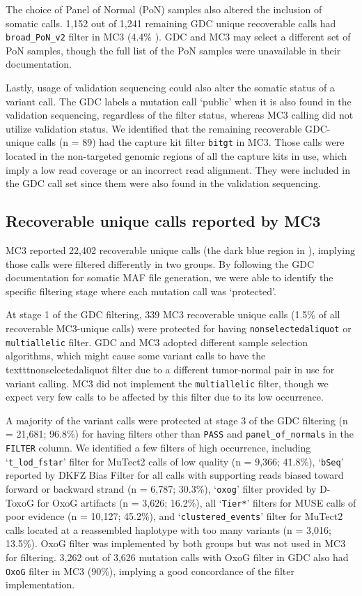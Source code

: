 The choice of Panel of Normal (PoN) samples also altered the inclusion of somatic calls. 1,152 out of 1,241 remaining GDC unique recoverable calls had \texttt{broad\_PoN\_v2} filter in MC3 (4.4\% ). GDC and MC3 may select a different set of PoN samples, though the full list of the PoN samples were unavailable in their documentation.

Lastly, usage of validation sequencing could also alter the somatic status of a variant call. The GDC labels a mutation call `public' when it is also found in the validation sequencing, regardless of the filter status, whereas MC3 calling did not utilize validation status. We identified that the remaining recoverable GDC-unique calls (n = 89) had the capture kit filter \texttt{bitgt} in MC3. Those calls were located in the non-targeted genomic regions of all the capture kits in use, which imply a low read coverage or an incorrect read alignment. They were included in the GDC call set since them were also found in the validation sequencing.


\subsection{Recoverable unique calls reported by MC3}
MC3 reported 22,402 recoverable unique calls (the dark blue region in ), implying those calls were filtered differently in two groups. By following the GDC documentation for somatic MAF file generation, we were able to identify the specific filtering stage where each mutation call was `protected'.

At stage 1 of the GDC filtering, 339 MC3 recoverable unique calls (1.5\% of all recoverable MC3-unique calls) were protected for having \texttt{nonselectedaliquot} or \texttt{multiallelic} filter. GDC and MC3 adopted different sample selection algorithms, which might cause some variant calls to have the texttt{nonselectedaliquot} filter due to a different tumor-normal pair in use for variant calling. MC3 did not implement the \texttt{multiallelic} filter, though we expect very few calls to be affected by this filter due to its low occurrence.

A majority of the variant calls were protected at stage 3 of the GDC filtering (n = 21,681; 96.8\%) for having filters other than \texttt{PASS} and \texttt{panel\_of\_normals} in the \texttt{FILTER} column. We identified a few filters of high occurrence, including `\texttt{t\_lod\_fstar}' filter for MuTect2 calls of low quality (n = 9,366; 41.8\%), `\texttt{bSeq}' reported by DKFZ Bias Filter for all calls with supporting reads biased toward forward or backward strand (n = 6,787; 30.3\%), `\texttt{oxog}' filter provided by D-ToxoG \cite{costellom_getzg:DiscoveryCharacterization2013} for OxoG artifacts (n = 3,626; 16.2\%), all `\texttt{Tier*}' filters for MUSE calls of poor evidence (n = 10,127; 45.2\%), and `\texttt{clustered\_events}' filter for MuTect2 calls located at a reassembled haplotype with too many variants (n = 3,016; 13.5\%). OxoG filter was implemented by both groups but was not used in MC3 for filtering. 3,262 out of 3,626 mutation calls with OxoG filter in GDC also had \texttt{OxoG} filter in MC3 (90\%), implying a good concordance of the filter implementation.

